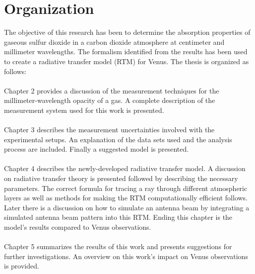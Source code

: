 \section{Organization}
The objective of this research has been to determine the absorption properties of gaseous sulfur dioxide in a carbon dioxide atmosphere at centimeter and millimeter wavelengths. The formalism identified from the results has been used to create a radiative transfer model (RTM) for Venus. The thesis is organized as follows:
\\ \\
\noindent Chapter 2 provides a discussion of the measurement techniques for the millimeter-wavelength opacity of a gas. A complete description of the measurement system used for this work is presented.
\\ \\
\noindent Chapter 3 describes the measurement uncertainties involved with the experimental setups. An explanation of the data sets used and the analysis process are included. Finally a suggested model is presented.
\\ \\
\noindent Chapter 4 describes the newly-developed radiative transfer model. A discussion on radiative transfer theory is presented followed by describing the necessary parameters. The correct formula for tracing a ray through different atmospheric layers as well as methods for making the RTM computationally efficient follows. Later there is a discussion on how to simulate an antenna beam by integrating a simulated antenna beam pattern into this RTM. Ending this chapter is the model's results compared to Venus observations.
\\ \\
\noindent Chapter 5 summarizes the results of this work and presents suggestions for further investigations. An overview on this work's impact on Venus observations is provided.
